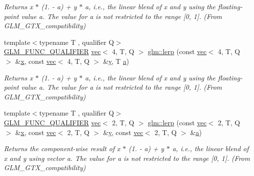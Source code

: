 \begin{DoxyCompactItemize}
\begin{DoxyCompactList}\small\item\em Returns x $\ast$ (1. -\/ a) + y $\ast$ a, i.\+e., the linear blend of x and y using the floating-\/point value a. The value for a is not restricted to the range \mbox{[}0, 1\mbox{]}. (From G\+L\+M\+\_\+\+G\+T\+X\+\_\+compatibility) \end{DoxyCompactList}\item 
{\footnotesize template$<$typename T , qualifier Q$>$ }\\\hyperlink{setup_8hpp_a33fdea6f91c5f834105f7415e2a64407}{G\+L\+M\+\_\+\+F\+U\+N\+C\+\_\+\+Q\+U\+A\+L\+I\+F\+I\+ER} \hyperlink{structglm_1_1vec}{vec}$<$ 4, T, Q $>$ \hyperlink{group__gtx__compatibility_ga89ac8e000199292ec7875519d27e214b}{glm\+::lerp} (const \hyperlink{structglm_1_1vec}{vec}$<$ 4, T, Q $>$ \&\hyperlink{_s_d_l__opengl_8h_ad0e63d0edcdbd3d79554076bf309fd47}{x}, const \hyperlink{structglm_1_1vec}{vec}$<$ 4, T, Q $>$ \&\hyperlink{_s_d_l__opengl_8h_a1675d9d7bb68e1657ff028643b4037e3}{y}, T \hyperlink{_s_d_l__opengl__glext_8h_a3309789fc188587d666cda5ece79cf82}{a})
\begin{DoxyCompactList}\small\item\em Returns x $\ast$ (1. -\/ a) + y $\ast$ a, i.\+e., the linear blend of x and y using the floating-\/point value a. The value for a is not restricted to the range \mbox{[}0, 1\mbox{]}. (From G\+L\+M\+\_\+\+G\+T\+X\+\_\+compatibility) \end{DoxyCompactList}\item 
{\footnotesize template$<$typename T , qualifier Q$>$ }\\\hyperlink{setup_8hpp_a33fdea6f91c5f834105f7415e2a64407}{G\+L\+M\+\_\+\+F\+U\+N\+C\+\_\+\+Q\+U\+A\+L\+I\+F\+I\+ER} \hyperlink{structglm_1_1vec}{vec}$<$ 2, T, Q $>$ \hyperlink{group__gtx__compatibility_gaf68de5baf72d16135368b8ef4f841604}{glm\+::lerp} (const \hyperlink{structglm_1_1vec}{vec}$<$ 2, T, Q $>$ \&\hyperlink{_s_d_l__opengl_8h_ad0e63d0edcdbd3d79554076bf309fd47}{x}, const \hyperlink{structglm_1_1vec}{vec}$<$ 2, T, Q $>$ \&\hyperlink{_s_d_l__opengl_8h_a1675d9d7bb68e1657ff028643b4037e3}{y}, const \hyperlink{structglm_1_1vec}{vec}$<$ 2, T, Q $>$ \&\hyperlink{_s_d_l__opengl__glext_8h_a3309789fc188587d666cda5ece79cf82}{a})
\begin{DoxyCompactList}\small\item\em Returns the component-\/wise result of x $\ast$ (1. -\/ a) + y $\ast$ a, i.\+e., the linear blend of x and y using vector a. The value for a is not restricted to the range \mbox{[}0, 1\mbox{]}. (From G\+L\+M\+\_\+\+G\+T\+X\+\_\+compatibility) \end{DoxyCompactList}\item 

\end{DoxyCompactItemize}
